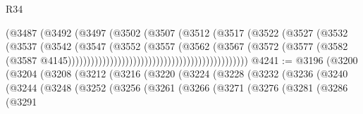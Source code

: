 \begin{lexlean}{R34}
\begin{coremodule}
                                                        (@3487
                                                          (@3492
                                                            (@3497
                                                              (@3502
                                                                (@3507
                                                                  (@3512
                                                                    (@3517
                                                                      (@3522
                                                                        (@3527
                                                                          (@3532
                                                                            (@3537
                                                                              (@3542
                                                                                (@3547
                                                                                  (@3552
                                                                                    (@3557
                                                                                      (@3562
                                                                                        (@3567
                                                                                          (@3572
                                                                                            (@3577
                                                                                              (@3582
                                                                                                (@3587
                                                                                                  @4145)))))))))))))))))))))))))))))))))))))))))))))))
@4241 := @3196
    (@3200
      (@3204
        (@3208
          (@3212
            (@3216
              (@3220
                (@3224
                  (@3228
                    (@3232
                      (@3236
                        (@3240
                          (@3244
                            (@3248
                              (@3252
                                (@3256
                                  (@3261
                                    (@3266
                                      (@3271
                                        (@3276
                                          (@3281
                                            (@3286
                                              (@3291

\end{coremodule}
\end{lexlean}
